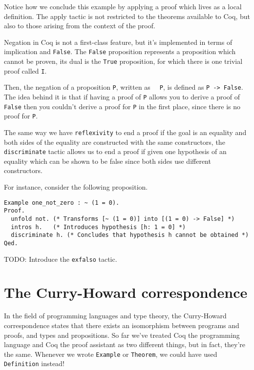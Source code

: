 Notice how we conclude this example by applying a proof which lives as a local definition. The apply 
tactic is not restricted to the theorems available to Coq, but also to those arising from the context
of the proof.

Negation in Coq is not a first-class feature, but it's implemented in terms of implication and 
\texttt{False}. The \texttt{False} proposition represents a proposition which cannot be
proven, its dual is the \texttt{True} proposition, for which there is one trivial proof called
\texttt{I}.

Then, the negation of a proposition \texttt{P}, written as \texttt{~ P}, is defined as
\texttt{P -> False}. The idea behind it is that if having a proof of \texttt{P} allows
you to derive a proof of \texttt{False} then you couldn't derive a proof for \texttt{P}
in the first place, since there is no proof for \texttt{P}.

The same way we have \texttt{reflexivity} to end a proof if the goal is an equality and both
sides of the equality are constructed with the same constructors, the \texttt{discriminate}
tactic allows us to end a proof if given one hypothesis of an equality which can be shown to be false
since both sides use different constructors.

For instance, consider the following proposition.
\begin{verbatim}
Example one_not_zero : ~ (1 = 0).
Proof.
  unfold not. (* Transforms [~ (1 = 0)] into [(1 = 0) -> False] *)
  intros h.   (* Introduces hypothesis [h: 1 = 0] *)
  discriminate h. (* Concludes that hypothesis h cannot be obtained *)
Qed.
\end{verbatim}


{\color{red} TODO: Introduce the \texttt{exfalso} tactic.}



\section{The Curry-Howard correspondence}

In the field of programming languages and type theory, the Curry-Howard correspondence states that there
exists an isomorphism between programs and proofs, and types and propositions. So far we've treated Coq
the programming language and Coq the proof assistant as two different things, but in fact, they're the 
same. Whenever we wrote \texttt{Example} or \texttt{Theorem}, we could have used
\texttt{Definition} instead!

